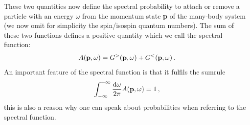 These two quantities now define the spectral probability to attach or remove a particle with an energy $\omega$ from the momentum state {\bf p} of the many-body system (we now omit for simplicity the spin/isospin quantum numbers). The sum of these two functions defines a positive quantity which we call the spectral function:
\begin{equation}
\label{spec_fun}
A({\bf p},\omega)=G^>({\bf p},\omega)+G^<({\bf p},\omega)\,.
\end{equation}
An important feature of the spectral function is that it fulfils the sumrule
\begin{equation}
\int_{-\infty}^{+\infty}\frac{{\rm d}\omega}{2\pi}A({\bf p},\omega)=1\,,
\end{equation} 
this is also a reason why one can speak about probabilities when referring to the spectral function. 


